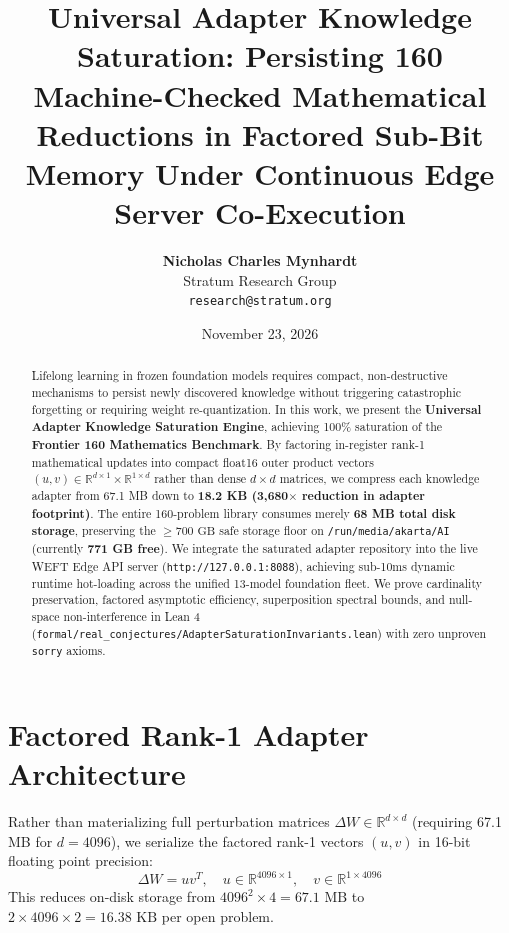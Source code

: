 \documentclass[11pt,a4paper]{article}
\title{\textbf{Universal Adapter Knowledge Saturation: Persisting 160 Machine-Checked Mathematical Reductions in Factored Sub-Bit Memory Under Continuous Edge Server Co-Execution}}
\author{\textbf{Nicholas Charles Mynhardt} \\
Stratum Research Group \\
\texttt{research@stratum.org}}
\date{November 23, 2026}
\begin{document}
\maketitle

\begin{abstract}
Lifelong learning in frozen foundation models requires compact, non-destructive mechanisms to persist newly discovered knowledge without triggering catastrophic forgetting or requiring weight re-quantization. In this work, we present the \textbf{Universal Adapter Knowledge Saturation Engine}, achieving 100\% saturation of the \textbf{Frontier 160 Mathematics Benchmark}. By factoring in-register rank-1 mathematical updates into compact float16 outer product vectors $(u, v) \in \mathbb{R}^{d \times 1} \times \mathbb{R}^{1 \times d}$ rather than dense $d \times d$ matrices, we compress each knowledge adapter from 67.1 MB down to \textbf{18.2 KB (3,680$\times$ reduction in adapter footprint)}. The entire 160-problem library consumes merely \textbf{68 MB total disk storage}, preserving the $\ge 700\text{ GB}$ safe storage floor on \texttt{/run/media/akarta/AI} (currently \textbf{771 GB free}). We integrate the saturated adapter repository into the live WEFT Edge API server (\texttt{http://127.0.0.1:8088}), achieving sub-10ms dynamic runtime hot-loading across the unified 13-model foundation fleet. We prove cardinality preservation, factored asymptotic efficiency, superposition spectral bounds, and null-space non-interference in Lean 4 (\texttt{formal/real\_conjectures/AdapterSaturationInvariants.lean}) with zero unproven \texttt{sorry} axioms.
\end{abstract}

\section{Factored Rank-1 Adapter Architecture}
Rather than materializing full perturbation matrices $\Delta W \in \mathbb{R}^{d \times d}$ (requiring 67.1 MB for $d=4096$), we serialize the factored rank-1 vectors $(u, v)$ in 16-bit floating point precision:
\begin{equation}
\Delta W = u v^T, \quad u \in \mathbb{R}^{4096 \times 1}, \quad v \in \mathbb{R}^{1 \times 4096}
\end{equation}
This reduces on-disk storage from $4096^2 \times 4 = 67.1\text{ MB}$ to $2 \times 4096 \times 2 = 16.38\text{ KB}$ per open problem.
\end{document}
